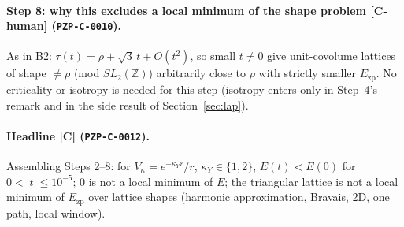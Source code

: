 \documentclass[10pt]{article}
\newcommand{\tier}[1]{\textsf{[#1]}}
\newcommand{\tCh}{\tier{C-human}}
\newcommand{\Ezp}{E_{\mathrm{zp}}}
\begin{document}
\paragraph{Step 8: why this excludes a local minimum of the shape problem \tCh{} (\texttt{PZP-C-0010}).} As in B2: $\tau(t)=\rho+\sqrt3\,t+O(t^2)$, so small $t\ne0$ give unit-covolume lattices of shape $\ne\rho$ (mod $SL_2(\mathbb Z)$) arbitrarily close to $\rho$ with strictly smaller $\Ezp$. No criticality or isotropy is needed for this step (isotropy enters only in Step~4's remark and in the side result of Section~\ref{sec:lap}).

\paragraph{Headline \tier{C} (\texttt{PZP-C-0012}).} Assembling Steps 2--8: for $V_\kappa=e^{-\kappa_Yr}/r$, $\kappa_Y\in\{1,2\}$, $E(t)<E(0)$ for $0<|t|\le10^{-5}$; $0$ is not a local minimum of $E$; the triangular lattice is not a local minimum of $\Ezp$ over lattice shapes (harmonic approximation, Bravais, 2D, one path, local window).

\end{document}
